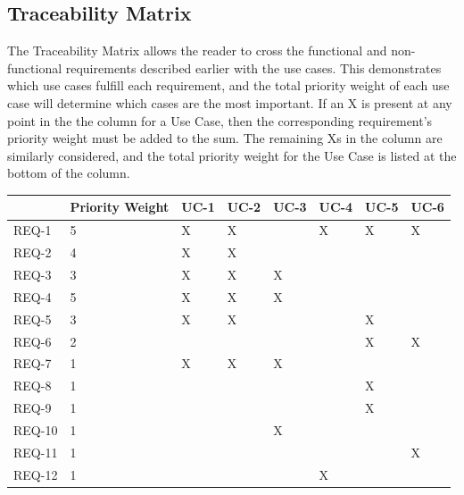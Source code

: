 \documentclass[letterpaper,english, 12pt]{scrreprt}
\begin{document}
\subsection{Traceability Matrix}
The Traceability Matrix allows the reader to cross the functional and non-functional requirements described earlier with the use cases. This demonstrates which use cases fulfill each requirement, and the total priority weight of each use case will determine which cases are the most important. If an X is present at any point in the the column for a Use Case, then the corresponding requirement's priority weight must be added to the sum. The remaining Xs in the column are similarly considered, and the total priority weight for the Use Case is listed at the bottom of the column. 

\renewcommand{\arraystretch}{0.4}
\begin{center}
        \begin{tabular}{|C{1cm}|C{1cm}|C{1cm}|C{1cm}|C{1cm}|C{1cm}|C{1cm}|C{1cm}|}
                \hline
                         & Priority Weight & UC-1 & UC-2 & UC-3 & UC-4 & UC-5 & UC-6 \\
                \hline
                        REQ-1 & 5 & X & X & & X & X & X  \\
                \hline
                        REQ-2 & 4 & X & X & & & &  \\
                \hline
                        REQ-3 & 3 & X & X & X  & & &  \\
                \hline
                        REQ-4 & 5 & X & X & X & & & \\
                \hline
                        REQ-5 & 3 & X & X & & & X & \\
                \hline
                        REQ-6 & 2 & & & & & X & X \\ %
                \hline
                        REQ-7 & 1 & X & X & X & & &  \\
                \hline
                        REQ-8 & 1 & & & & & X  &  \\
                \hline
                        REQ-9 & 1 & & & & & X &  \\
                \hline
                        REQ-10 & 1 & & & X & & &  \\
                \hline
                        REQ-11 & 1 & & & & & & X  \\
		\hline	
			REQ-12 & 1 & & & & X & & \\

\end{tabular}
\end{center}
\end{document}
